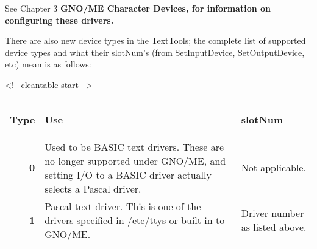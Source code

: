 \documentclass{report}
\begin{document}
See Chapter 3 \bf GNO/ME Character Devices\rm,
for information on configuring these drivers.

There are also new device types in the
TextTools; the complete list of supported device types and what
their slotNum's (from SetInputDevice, SetOutputDevice, etc) mean
is as follows:


\begin{rawhtml}
<!-- cleantable-start -->
\end{rawhtml}

\begin{tabular}{rll}
\begin{minipage}[t]{1cm}
	\sloppy
	\bf Type \rm
\end{minipage} \hfill &
\begin{minipage}[t]{5cm}
	\sloppy
	\begin{center}
	\bf Use \rm 
	\end{center}
\end{minipage} \hfill &
\begin{minipage}[t]{5cm}
	\sloppy
	\bf slotNum \rm
\end{minipage} \hfill \\ \cline{1-3}


\begin{minipage}[b]{1cm}
	\sloppy 
	\bf 0 \rm
\end{minipage} \hfill &
\begin{minipage}[t]{5cm}
	\sloppy
	Used to be \index{BASIC} BASIC text drivers. These
	are no longer supported under GNO/ME, and setting I/O to
	a BASIC driver actually selects a Pascal driver.
\end{minipage} \hfill &
\begin{minipage}[t]{5cm}
	\sloppy
	Not applicable.
\end{minipage} \hfill \\


\begin{minipage}[b]{1cm}
	\sloppy 
	\bf 1 \rm
\end{minipage} \hfill &
\begin{minipage}[t]{5cm}
	\sloppy
	Pascal text driver. This is one of the drivers specified in 
	\index{/etc/ttys} /etc/ttys or built-in to GNO/ME.
\end{minipage} \hfill &
\begin{minipage}[t]{5cm}
	\sloppy
	Driver number as listed above.
\end{minipage} \hfill \\



\end{tabular}
\end{document}
